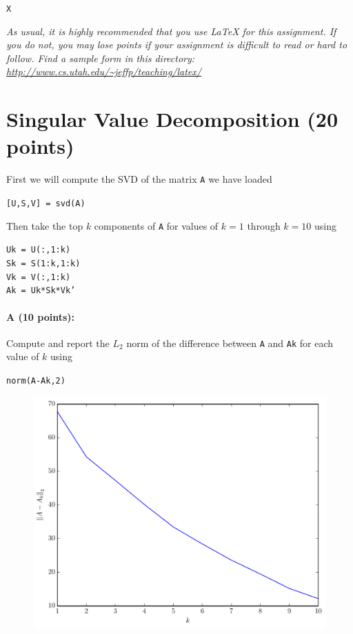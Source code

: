 \documentclass[11pt]{article}
\begin{document}
\texttt{X}

\vspace{.1in}

\emph{As usual, it is highly recommended that you use LaTeX for this assignment.  If you do not, you may lose points if your assignment is difficult to read or hard to follow.  Find a sample form in this directory:
\url{http://www.cs.utah.edu/~jeffp/teaching/latex/}}


\section{Singular Value Decomposition (20 points)}

First we will compute the SVD of the matrix \texttt{A} we have loaded

\noindent
\texttt{[U,S,V] = svd(A)}

Then take the top $k$ components of \texttt{A} for values of $k = 1$ through $k=10$ using

\noindent
\texttt{Uk = U(:,1:k)}
\\ \noindent
\texttt{Sk = S(1:k,1:k)}
\\ \noindent
\texttt{Vk = V(:,1:k)}
\\ \noindent
\texttt{Ak = Uk*Sk*Vk'}

\paragraph{A (10 points):}
Compute and report the $L_2$ norm of the difference between \texttt{A} and \texttt{Ak} for each value of $k$ using

\noindent
\texttt{norm(A-Ak,2)}

\begin{figure}[H]
\centering
\includegraphics[width=.75\textwidth]{prob1a.pdf}
\end{figure}
\end{document}
